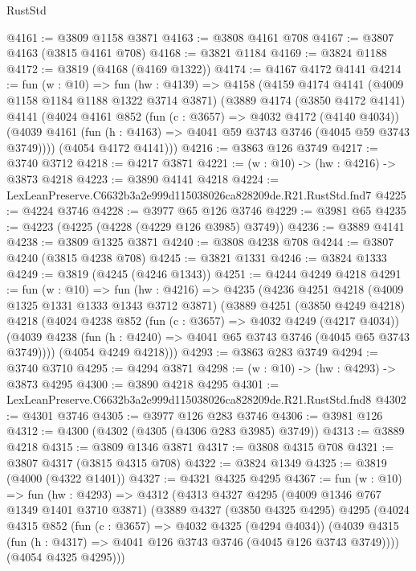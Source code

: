 \begin{lexlean}{RustStd}
\begin{coremodule}
@4161 := @3809 @1158 @3871
@4163 := @3808 @4161 @708
@4167 := @3807 @4163 (@3815 @4161 @708)
@4168 := @3821 @1184
@4169 := @3824 @1188
@4172 := @3819 (@4168 (@4169 @1322))
@4174 := @4167 @4172 @4141
@4214 := fun (w : @10) =>
  fun (hw : @4139) =>
  @4158
    (@4159
      @4174
      @4141
      (@4009 @1158 @1184 @1188 @1322 @3714 @3871)
      (@3889
        @4174
        (@3850 @4172 @4141)
        @4141
        (@4024
          @4161
          @852
          (fun (c : @3657) => @4032 @4172 (@4140 @4034))
          (@4039 @4161 (fun (h : @4163) => @4041 @59 @3743 @3746 (@4045 @59 @3743 @3749))))
        (@4054 @4172 @4141)))
@4216 := @3863 @126 @3749
@4217 := @3740 @3712
@4218 := @4217 @3871
@4221 := (w : @10) -> (hw : @4216) -> @3873 @4218
@4223 := @3890 @4141 @4218
@4224 := LexLeanPreserve.C6632b3a2e999d115038026ca828209de.R21.RustStd.fnd7
@4225 := @4224 @3746
@4228 := @3977 @65 @126 @3746
@4229 := @3981 @65
@4235 := @4223 (@4225 (@4228 (@4229 @126 @3985) @3749))
@4236 := @3889 @4141
@4238 := @3809 @1325 @3871
@4240 := @3808 @4238 @708
@4244 := @3807 @4240 (@3815 @4238 @708)
@4245 := @3821 @1331
@4246 := @3824 @1333
@4249 := @3819 (@4245 (@4246 @1343))
@4251 := @4244 @4249 @4218
@4291 := fun (w : @10) =>
  fun (hw : @4216) =>
  @4235
    (@4236
      @4251
      @4218
      (@4009 @1325 @1331 @1333 @1343 @3712 @3871)
      (@3889
        @4251
        (@3850 @4249 @4218)
        @4218
        (@4024
          @4238
          @852
          (fun (c : @3657) => @4032 @4249 (@4217 @4034))
          (@4039 @4238 (fun (h : @4240) => @4041 @65 @3743 @3746 (@4045 @65 @3743 @3749))))
        (@4054 @4249 @4218)))
@4293 := @3863 @283 @3749
@4294 := @3740 @3710
@4295 := @4294 @3871
@4298 := (w : @10) -> (hw : @4293) -> @3873 @4295
@4300 := @3890 @4218 @4295
@4301 := LexLeanPreserve.C6632b3a2e999d115038026ca828209de.R21.RustStd.fnd8
@4302 := @4301 @3746
@4305 := @3977 @126 @283 @3746
@4306 := @3981 @126
@4312 := @4300 (@4302 (@4305 (@4306 @283 @3985) @3749))
@4313 := @3889 @4218
@4315 := @3809 @1346 @3871
@4317 := @3808 @4315 @708
@4321 := @3807 @4317 (@3815 @4315 @708)
@4322 := @3824 @1349
@4325 := @3819 (@4000 (@4322 @1401))
@4327 := @4321 @4325 @4295
@4367 := fun (w : @10) =>
  fun (hw : @4293) =>
  @4312
    (@4313
      @4327
      @4295
      (@4009 @1346 @767 @1349 @1401 @3710 @3871)
      (@3889
        @4327
        (@3850 @4325 @4295)
        @4295
        (@4024
          @4315
          @852
          (fun (c : @3657) => @4032 @4325 (@4294 @4034))
          (@4039 @4315 (fun (h : @4317) => @4041 @126 @3743 @3746 (@4045 @126 @3743 @3749))))
        (@4054 @4325 @4295)))

\end{coremodule}
\end{lexlean}
